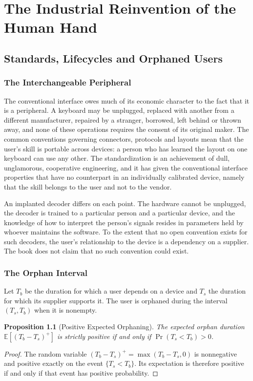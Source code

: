 \documentclass[11pt,twoside,openany]{book}
\newtheorem{proposition}[theorem]{Proposition}
\theoremstyle{definition}
\theoremstyle{remark}
\newcommand{\E}{\mathbb{E}}
\begin{document}
\part{The Industrial Reinvention of the Human Hand}

\chapter{Standards, Lifecycles and Orphaned Users}

\section{The Interchangeable Peripheral}

The conventional interface owes much of its economic character to the fact that it is a peripheral. A keyboard may be unplugged, replaced with another from a different manufacturer, repaired by a stranger, borrowed, left behind or thrown away, and none of these operations requires the consent of its original maker. The common conventions governing connectors, protocols and layouts mean that the user's skill is portable across devices: a person who has learned the layout on one keyboard can use any other. The standardization is an achievement of dull, unglamorous, cooperative engineering, and it has given the conventional interface properties that have no counterpart in an individually calibrated device, namely that the skill belongs to the user and not to the vendor.

An implanted decoder differs on each point. The hardware cannot be unplugged, the decoder is trained to a particular person and a particular device, and the knowledge of how to interpret the person's signals resides in parameters held by whoever maintains the software. To the extent that no open convention exists for such decoders, the user's relationship to the device is a dependency on a supplier. The book does not claim that no such convention could exist.

\section{The Orphan Interval}

Let $T_b$ be the duration for which a user depends on a device and $T_s$ the duration for which its supplier supports it. The user is orphaned during the interval $(T_s,T_b)$ when it is nonempty.

\begin{proposition}[Positive Expected Orphaning]\label{prop:orphan}
The expected orphan duration $\E\left[(T_b-T_s)^{+}\right]$ is strictly positive if and only if $\Pr(T_s<T_b)>0$.
\end{proposition}
\begin{proof}
The random variable $(T_b-T_s)^{+}=\max(T_b-T_s,0)$ is nonnegative and positive exactly on the event $\{T_s<T_b\}$. Its expectation is therefore positive if and only if that event has positive probability.
\end{proof}
\end{document}

